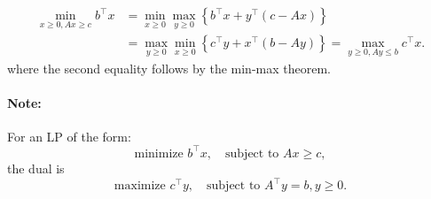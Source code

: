 \begin{align*}
\mathop {\min }\limits_{x \ge 0,Ax \ge c} {b^\top}x &= \mathop {\min }\limits_{x \ge 0} \mathop {\max }\limits_{y \ge 0} \left\{ {{b^\top}x + {y^\top}(c - Ax)} \right\}\\
 &= \mathop {\max }\limits_{y \ge 0} \mathop {\min }\limits_{x \ge 0} \left\{ {{c^\top}y + {x^\top}(b - Ay)} \right\} = \mathop {\max }\limits_{y \ge 0,Ay \le b} {c^\top}x.
\end{align*}
where the second equality follows by the min-max theorem.

\paragraph{Note:} For an LP of the form:
\begin{equation*}
 \textrm{minimize } {b^\top}x,   \quad \textrm{subject to } Ax \ge c,
\end{equation*}
the dual is
\begin{equation*}
\textrm{maximize } {c^\top}y,   \quad \textrm{subject to } {A^\top}y
= b,  y \ge 0.
\end{equation*}

